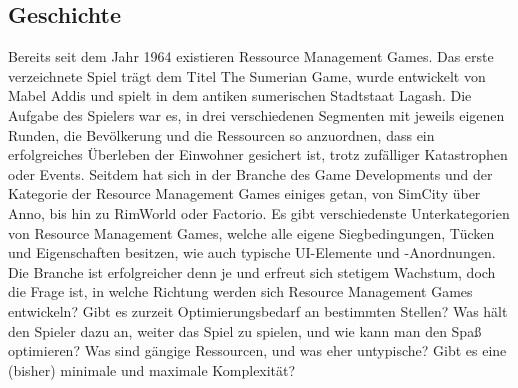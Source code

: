 \subsection{Geschichte}
Bereits seit dem Jahr 1964 existieren Ressource Management Games. Das erste verzeichnete Spiel trägt dem Titel \glqq The Sumerian Game\grqq, wurde entwickelt von Mabel Addis und spielt in dem antiken sumerischen Stadtstaat Lagash. Die Aufgabe des Spielers war es, in drei verschiedenen Segmenten mit jeweils eigenen Runden, die Bevölkerung und die Ressourcen so anzuordnen, dass ein erfolgreiches Überleben der Einwohner gesichert ist, trotz zufälliger Katastrophen oder Events. Seitdem hat sich in der Branche des Game Developments und der Kategorie der Resource Management Games einiges getan, von SimCity über Anno, bis hin zu RimWorld oder Factorio. Es gibt verschiedenste Unterkategorien von Resource Management Games, welche alle eigene Siegbedingungen, Tücken und Eigenschaften besitzen, wie auch typische UI-Elemente und -Anordnungen. Die Branche ist erfolgreicher denn je und erfreut sich stetigem Wachstum, doch die Frage ist, in welche Richtung werden sich Resource Management Games entwickeln? Gibt es zurzeit Optimierungsbedarf an bestimmten Stellen? Was hält den Spieler dazu an, weiter das Spiel zu spielen, und wie kann man den Spaß optimieren? Was sind gängige Ressourcen, und was eher untypische? Gibt es eine (bisher) minimale und maximale Komplexität?